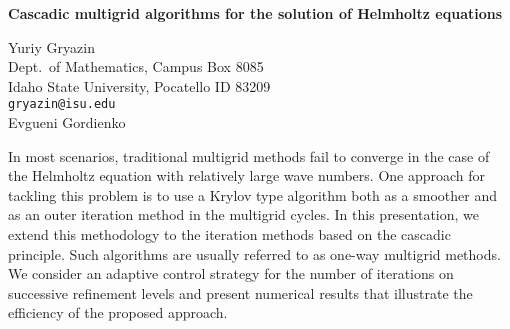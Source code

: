 \documentclass{report}
\begin{document}

\begin{center}
{\large
{\bf Cascadic multigrid algorithms for the solution of Helmholtz equations}}

	Yuriy Gryazin \\
	Dept.~of Mathematics, Campus Box 8085 \\
	Idaho State University, Pocatello ID 83209 \\
	{\tt gryazin@isu.edu} \\
	Evgueni Gordienko
\end{center}
In most scenarios, traditional multigrid methods fail to
converge in the case of the Helmholtz equation with
relatively large wave numbers. One approach for tackling
this problem is to use a Krylov type algorithm both as a
smoother and as an outer iteration method in the multigrid
cycles. In this presentation, we extend this methodology to
the iteration methods based on the cascadic principle. Such
algorithms are usually referred to as one-way multigrid
methods. We consider an adaptive control strategy for the
number of iterations on successive refinement levels and
present numerical results that illustrate the efficiency of
the proposed approach.



\end{document}
